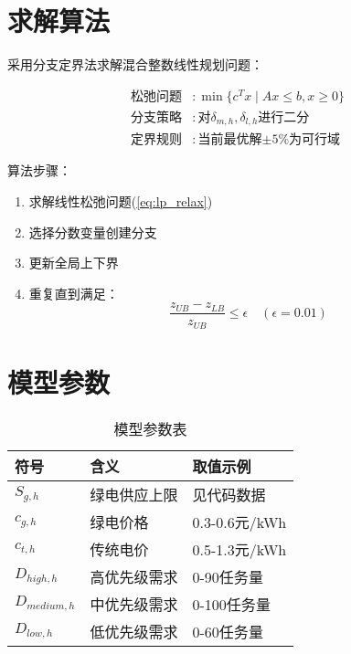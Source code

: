 \documentclass{article}
\begin{document}
\section{求解算法}

采用分支定界法求解混合整数线性规划问题：

\begin{align}
\text{松弛问题} &: \min \{c^T x \mid Ax \leq b, x \geq 0\} \label{eq:lp_relax} \\
\text{分支策略} &: \text{对$\delta_{m,h},\delta_{l,h}$进行二分} \nonumber \\
\text{定界规则} &: \text{当前最优解$\pm 5\%$为可行域} \nonumber
\end{align}

算法步骤：
\begin{enumerate}
\item 求解线性松弛问题(\ref{eq:lp_relax})
\item 选择分数变量创建分支
\item 更新全局上下界
\item 重复直到满足：
$$
\frac{z_{UB} - z_{LB}}{z_{UB}} \leq \epsilon \quad (\epsilon=0.01)
$$
\end{enumerate}

\section{模型参数}

\begin{table}[h]
\centering
\caption{模型参数表}
\begin{tabular}{lll}
\toprule
符号 & 含义 & 取值示例 \\
\midrule
$S_{g,h}$ & 绿电供应上限 & 见代码数据 \\
$c_{g,h}$ & 绿电价格 & 0.3-0.6元/kWh \\
$c_{t,h}$ & 传统电价 & 0.5-1.3元/kWh \\
$D_{high,h}$ & 高优先级需求 & 0-90任务量 \\
$D_{medium,h}$ & 中优先级需求 & 0-100任务量 \\
$D_{low,h}$ & 低优先级需求 & 0-60任务量 \\
\bottomrule
\end{tabular}
\end{table}
\end{document}
